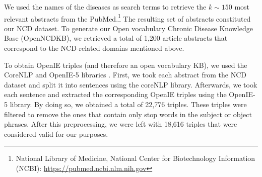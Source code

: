 \documentclass[preprint]{elsarticle}
\begin{document}



We used the names of the diseases as search terms to retrieve the $k\sim 150$ most relevant abstracts from the PubMed.\footnote{National Library of Medicine, National Center for Biotechnology Information (NCBI):  \url{https://pubmed.ncbi.nlm.nih.gov}} %
The resulting set of abstracts constituted our NCD dataset. To generate our Open vocabulary Chronic Disease Knowledge Base (OpenNCDKB), we retrieved a total of 1,200 article abstracts that correspond to the NCD-related domains mentioned above.

To obtain OpenIE triples (and therefore an open vocabulary KB), we used the CoreNLP and OpenIE-5 libraries \cite{manning2014stanford,saha-etal-2017-bootstrapping}. First, we took each abstract from the NCD dataset and split it into sentences using the coreNLP library. Afterwards, we took each sentence and extracted the corresponding OpenIE triples using the OpenIE-5 library. By doing so, we obtained a total of 22,776 triples.
These triples were filtered to remove the ones that contain only stop words in the subject or object phrases. After this preprocessing, we were left with 18,616 triples that were considered valid for our purposes. 
\end{document}
